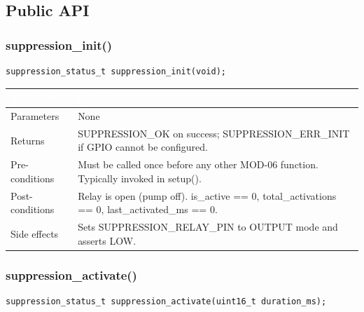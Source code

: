 \documentclass[12pt,a4paper]{article}
\newcommand{\theadtext}[1]{\textcolor{white}{\textbf{#1}}}
\newcommand{\fn}[1]{{\footnotesize\ttfamily #1}}
\begin{document}
\subsection{Public API}

\subsubsection{\fn{suppression\_init()}}

\begin{lstlisting}[caption={Signature}]
suppression_status_t suppression_init(void);
\end{lstlisting}

\begin{table}[H]\centering\small
\begin{tabularx}{\textwidth}{L{3.5cm} X}
\toprule
{}\theadtext{Attribute} & \theadtext{Detail} \\
\midrule
{}   Parameters     & None \\
 Returns        & \fn{SUPPRESSION\_OK} on success; \fn{SUPPRESSION\_ERR\_INIT} if GPIO cannot be configured. \\
   Pre-conditions & Must be called once before any other MOD-06 function. Typically invoked in \fn{setup()}. \\
 Post-conditions & Relay is open (pump off). \fn{is\_active == 0}, \fn{total\_activations == 0}, \fn{last\_activated\_ms == 0}. \\
   Side effects   & Sets \fn{SUPPRESSION\_RELAY\_PIN} to OUTPUT mode and asserts LOW. \\
\bottomrule
\end{tabularx}
\end{table}

\subsubsection{\fn{suppression\_activate()}}

\begin{lstlisting}[caption={Signature}]
suppression_status_t suppression_activate(uint16_t duration_ms);
\end{lstlisting}
\end{document}
